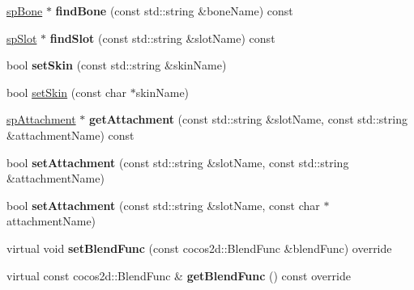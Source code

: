 \begin{DoxyCompactItemize}
\mbox{\label{classspine_1_1SkeletonRenderer_a17118a0d783fe66cb91a2b226b35a573}} 
\hyperlink{structspBone}{sp\+Bone} $\ast$ {\bfseries find\+Bone} (const std\+::string \&bone\+Name) const
\item 
\mbox{\label{classspine_1_1SkeletonRenderer_a05de9771804b64e227b259fa9c042e97}} 
\hyperlink{structspSlot}{sp\+Slot} $\ast$ {\bfseries find\+Slot} (const std\+::string \&slot\+Name) const
\item 
\mbox{\label{classspine_1_1SkeletonRenderer_a5c2238c995c1e33a25a476213d8b5cbb}} 
bool {\bfseries set\+Skin} (const std\+::string \&skin\+Name)
\item 
bool \hyperlink{classspine_1_1SkeletonRenderer_ab56abe60544227f4e4ce72c1ffd463c7}{set\+Skin} (const char $\ast$skin\+Name)
\item 
\mbox{\label{classspine_1_1SkeletonRenderer_ac47f6b0fc383c455742ff5cca906feb4}} 
\hyperlink{structspAttachment}{sp\+Attachment} $\ast$ {\bfseries get\+Attachment} (const std\+::string \&slot\+Name, const std\+::string \&attachment\+Name) const
\item 
\mbox{\label{classspine_1_1SkeletonRenderer_a538858bb3577e94b4118c0275783bc92}} 
bool {\bfseries set\+Attachment} (const std\+::string \&slot\+Name, const std\+::string \&attachment\+Name)
\item 
\mbox{\label{classspine_1_1SkeletonRenderer_a8b24604ed42ceed528e20c79b5a72bc6}} 
bool {\bfseries set\+Attachment} (const std\+::string \&slot\+Name, const char $\ast$attachment\+Name)
\item 
\mbox{\label{classspine_1_1SkeletonRenderer_a43f06f03ff35bd681f3a9b99b94421a7}} 
virtual void {\bfseries set\+Blend\+Func} (const cocos2d\+::\+Blend\+Func \&blend\+Func) override
\item 
\mbox{\label{classspine_1_1SkeletonRenderer_a244c3560a517ef7fc70a8c7b99a85600}} 
virtual const cocos2d\+::\+Blend\+Func \& {\bfseries get\+Blend\+Func} () const override

\end{DoxyCompactItemize}
